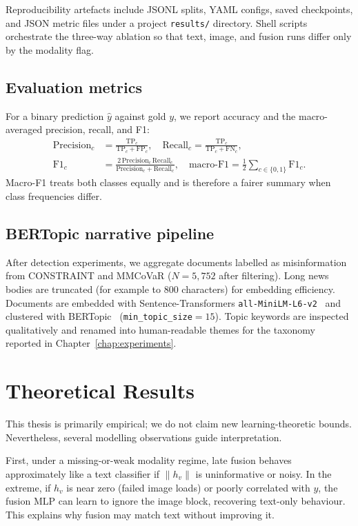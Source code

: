 \documentclass[12pt, a4paper]{report}
\begin{document}
Reproducibility artefacts include JSONL splits, YAML configs, saved checkpoints, and JSON metric files under a project \texttt{results/} directory.
Shell scripts orchestrate the three-way ablation so that text, image, and fusion runs differ only by the modality flag.

\subsection{Evaluation metrics}

For a binary prediction $\hat{y}$ against gold $y$, we report accuracy and the macro-averaged precision, recall, and F1:
\begin{align}
\mathrm{Precision}_c &= \frac{\mathrm{TP}_c}{\mathrm{TP}_c+\mathrm{FP}_c}, \quad
\mathrm{Recall}_c = \frac{\mathrm{TP}_c}{\mathrm{TP}_c+\mathrm{FN}_c}, \\
\mathrm{F1}_c &= \frac{2\,\mathrm{Precision}_c\,\mathrm{Recall}_c}{\mathrm{Precision}_c+\mathrm{Recall}_c}, \quad
\mathrm{macro\text{-}F1} = \frac{1}{2}\sum_{c\in\{0,1\}} \mathrm{F1}_c.
\end{align}
Macro-F1 treats both classes equally and is therefore a fairer summary when class frequencies differ.

\subsection{BERTopic narrative pipeline}

After detection experiments, we aggregate documents labelled as misinformation from CONSTRAINT and MMCoVaR ($N=5{,}752$ after filtering).
Long news bodies are truncated (for example to $800$ characters) for embedding efficiency.
Documents are embedded with Sentence-Transformers \texttt{all-MiniLM-L6-v2}~\cite{reimers2019sentence} and clustered with BERTopic~\cite{grootendorst2022bertopic} (\texttt{min\_topic\_size}$=15$).
Topic keywords are inspected qualitatively and renamed into human-readable themes for the taxonomy reported in Chapter~\ref{chap:experiments}.

\section{Theoretical Results}
\label{sec:theoretical-results}

This thesis is primarily empirical; we do not claim new learning-theoretic bounds.
Nevertheless, several modelling observations guide interpretation.

First, under a missing-or-weak modality regime, late fusion behaves approximately like a text classifier if $\|h_v\|$ is uninformative or noisy.
In the extreme, if $h_v$ is near zero (failed image loads) or poorly correlated with $y$, the fusion MLP can learn to ignore the image block, recovering text-only behaviour.
This explains why fusion may match text without improving it.
\end{document}
